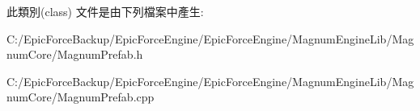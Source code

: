 此類別(class) 文件是由下列檔案中產生\+:\begin{DoxyCompactItemize}
\item 
C\+:/\+Epic\+Force\+Backup/\+Epic\+Force\+Engine/\+Epic\+Force\+Engine/\+Magnum\+Engine\+Lib/\+Magnum\+Core/Magnum\+Prefab.\+h\item 
C\+:/\+Epic\+Force\+Backup/\+Epic\+Force\+Engine/\+Epic\+Force\+Engine/\+Magnum\+Engine\+Lib/\+Magnum\+Core/Magnum\+Prefab.\+cpp\end{DoxyCompactItemize}
